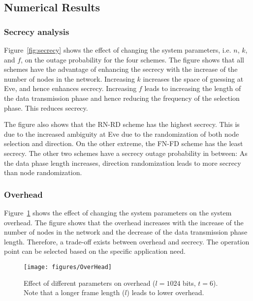\documentclass[10pt,letterpaper,conference]{IEEEtran}
\begin{document}
\begin{figure*}[!t]
\centering
{}
\caption{Effect of different parameters on secrecy.}
\label{fig:secrecy}
\end{figure*}

\subsection{Numerical Results}
\subsubsection{Secrecy analysis}
Figure~\ref{fig:secrecy} shows the effect of changing the system parameters,
i.e. $n$, $k$, and $f$, on the outage probability for the four schemes. The
figure shows that all schemes have the advantage of enhancing the secrecy with
the increase of the number of nodes in the network. Increasing $k$ increases the
space of guessing at Eve, and hence enhances secrecy. Increasing $f$ leads
to increasing the length of the data transmission phase and hence reducing the
frequency of the selection phase. This reduces secrecy.

The figure also shows that the RN-RD scheme has the highest secrecy. This is due
to the increased ambiguity at Eve due to the randomization of both node
selection and direction. On the other extreme, the FN-FD scheme has the least secrecy.
The other two schemes have a secrecy outage probability in between: As the data
phase length increases, direction randomization leads to more secrecy than node
randomization.

\subsubsection{Overhead}
Figure~\ref{fig:overhead} shows the effect of changing the system parameters on
the system overhead. The figure shows that the overhead increases with
the increase of the number of nodes in the network and the decrease of the data
transmission phase length. Therefore, a trade-off exists between overhead and
secrecy. The operation point can be selected based on the specific application
need.

\begin{figure}[!t]
\centering
\texttt{[image: figures/OverHead]}
\caption{Effect of different parameters on overhead ($l= 1024$ bits, $t=6$). Note that a longer frame length ($l$) leads to lower overhead.}
\label{fig:overhead}
\end{figure}
\end{document}
